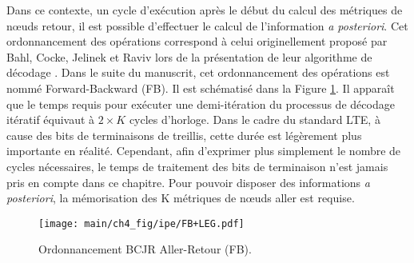 Dans ce contexte, un cycle d'exécution après le début du calcul des métriques de nœuds retour, il est possible d'effectuer le calcul de l'information 
\textit{a posteriori}. Cet ordonnancement des opérations correspond à celui originellement proposé par Bahl, Cocke, 
Jelinek et Raviv lors de la présentation de leur algorithme de décodage \cite{bcjr}. Dans le suite du manuscrit, cet
ordonnancement des opérations est nommé Forward-Backward (FB). Il est schématisé dans la Figure \ref{fig:siso_seq}.
Il apparaît que le temps requis pour exécuter une demi-itération du processus de décodage itératif équivaut à $2\times K$ cycles d'horloge. Dans le cadre du standard LTE, à cause des bits de terminaisons de treillis, cette durée est légèrement
plus importante en réalité. Cependant, afin d'exprimer plus simplement le nombre de cycles nécessaires, le temps de 
traitement des bits de terminaison n'est jamais pris en compte dans ce chapitre.
Pour pouvoir disposer des informations 
\textit{a posteriori}, la mémorisation des K métriques de nœuds aller est requise. 

\begin{figure}[!h]
	\centering
	\texttt{[image: main/ch4\_fig/ipe/FB+LEG.pdf]}
	\caption{Ordonnancement BCJR Aller-Retour (FB). \label{fig:siso_seq}}
\end{figure}

